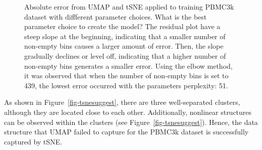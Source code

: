 \documentclass[
  12pt]{article}
\begin{document}
\begin{figure}[H]


\caption{\label{fig-abserrorPBMC}Absolute error from UMAP and tSNE
applied to training PBMC3k dataset with diffferent parameter choices.
What is the best parameter choice to create the model? The residual plot
have a steep slope at the beginning, indicating that a smaller number of
non-empty bins causes a larger amount of error. Then, the slope
gradually declines or level off, indicating that a higher number of
non-empty bins generates a smaller error. Using the elbow method, it was
observed that when the number of non-empty bins is set to 439, the
lowest error occurred with the parameters perplexity: 51.}

\end{figure}%

As shown in Figure~\ref{fig-tsnesuggest}, there are three well-separated
clusters, although they are located close to each other. Additionally,
nonlinear structures can be observed within the clusters (see
Figure~\ref{fig-tsnesuggest}). Hence, the data structure that UMAP
failed to capture for the PBMC3k dataset is successfully captured by
tSNE.
\end{document}
